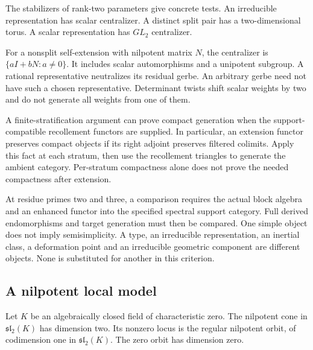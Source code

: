 The stabilizers of rank-two parameters give concrete tests.
An irreducible representation has scalar centralizer.
A distinct split pair has a two-dimensional torus.
A scalar representation has \(GL_2\) centralizer.

For a nonsplit self-extension with nilpotent matrix \(N\),
the centralizer is \(\{aI+bN:a\ne0\}\). It includes scalar
automorphisms and a unipotent subgroup. A rational representative
neutralizes its residual gerbe. An arbitrary gerbe need not have
such a chosen representative.
Determinant twists shift scalar weights by two and do not generate
all weights from one of them.

A finite-stratification argument can prove compact generation when
the support-compatible recollement functors are supplied.
In particular, an extension functor preserves compact objects if
its right adjoint preserves filtered colimits.
Apply this fact at each stratum, then use the recollement triangles
to generate the ambient category.
Per-stratum compactness alone does not prove the needed compactness
after extension.

At residue primes two and three, a comparison requires the actual
block algebra and an enhanced functor into the specified spectral support category.
Full derived endomorphisms and target generation must then be compared.
One simple object does not imply semisimplicity.
A type, an irreducible representation, an inertial class, a
deformation point and an irreducible geometric component are
different objects. None is substituted for another in this criterion.



\subsection{A nilpotent local model}
\label{v4-arith:ic:w6-g:agdet-transition}

\begin{proposition}
\label{v4-arith:ic:w6-g:prop:codim-2}
Let $K$ be an algebraically closed field of characteristic zero.
The nilpotent cone in $\mathfrak{sl}_2(K)$ has dimension two.
Its nonzero locus is the regular nilpotent orbit, of codimension
one in $\mathfrak{sl}_2(K)$. The zero orbit has dimension zero.
\end{proposition}

